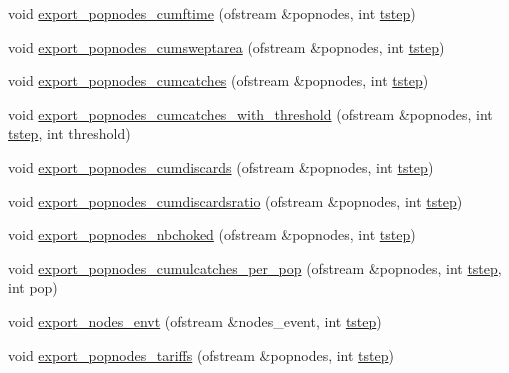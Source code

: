 \begin{DoxyCompactItemize}
\item 
void \mbox{\hyperlink{class_node_ad0c96ba0aff8cd3b1caad58c43c64273}{export\+\_\+popnodes\+\_\+cumftime}} (ofstream \&popnodes, int \mbox{\hyperlink{thread__vessels_8cpp_a84bc73d278de929ec9974e1a95d9b23a}{tstep}})
\item 
void \mbox{\hyperlink{class_node_a8e870904fc79d763ee027b5c77a85c00}{export\+\_\+popnodes\+\_\+cumsweptarea}} (ofstream \&popnodes, int \mbox{\hyperlink{thread__vessels_8cpp_a84bc73d278de929ec9974e1a95d9b23a}{tstep}})
\item 
void \mbox{\hyperlink{class_node_a65ff7a08e7934016e630e83a8f5f27c3}{export\+\_\+popnodes\+\_\+cumcatches}} (ofstream \&popnodes, int \mbox{\hyperlink{thread__vessels_8cpp_a84bc73d278de929ec9974e1a95d9b23a}{tstep}})
\item 
void \mbox{\hyperlink{class_node_a22ff431ad49865e52f83e4c0a6bc1826}{export\+\_\+popnodes\+\_\+cumcatches\+\_\+with\+\_\+threshold}} (ofstream \&popnodes, int \mbox{\hyperlink{thread__vessels_8cpp_a84bc73d278de929ec9974e1a95d9b23a}{tstep}}, int threshold)
\item 
void \mbox{\hyperlink{class_node_ae164fea4f1f620f422cfaf25b67ca864}{export\+\_\+popnodes\+\_\+cumdiscards}} (ofstream \&popnodes, int \mbox{\hyperlink{thread__vessels_8cpp_a84bc73d278de929ec9974e1a95d9b23a}{tstep}})
\item 
void \mbox{\hyperlink{class_node_a23d913f96c8b237eb9b0273fa8707800}{export\+\_\+popnodes\+\_\+cumdiscardsratio}} (ofstream \&popnodes, int \mbox{\hyperlink{thread__vessels_8cpp_a84bc73d278de929ec9974e1a95d9b23a}{tstep}})
\item 
void \mbox{\hyperlink{class_node_af2d5f3b07a95ee360df6cfa1b2d6da59}{export\+\_\+popnodes\+\_\+nbchoked}} (ofstream \&popnodes, int \mbox{\hyperlink{thread__vessels_8cpp_a84bc73d278de929ec9974e1a95d9b23a}{tstep}})
\item 
void \mbox{\hyperlink{class_node_a9e51b332476fac151e0a4f8c4fe445f6}{export\+\_\+popnodes\+\_\+cumulcatches\+\_\+per\+\_\+pop}} (ofstream \&popnodes, int \mbox{\hyperlink{thread__vessels_8cpp_a84bc73d278de929ec9974e1a95d9b23a}{tstep}}, int pop)
\item 
void \mbox{\hyperlink{class_node_a9e8afa02d6c6c090a18335770644de00}{export\+\_\+nodes\+\_\+envt}} (ofstream \&nodes\+\_\+event, int \mbox{\hyperlink{thread__vessels_8cpp_a84bc73d278de929ec9974e1a95d9b23a}{tstep}})
\item 
void \mbox{\hyperlink{class_node_a817e8f2ae1fc3395c02a67efcce724a8}{export\+\_\+popnodes\+\_\+tariffs}} (ofstream \&popnodes, int \mbox{\hyperlink{thread__vessels_8cpp_a84bc73d278de929ec9974e1a95d9b23a}{tstep}})

\end{DoxyCompactItemize}
